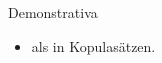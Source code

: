 \begin{syntax}{Demonstrativa}{}
\begin{itemize}
	\item {} als \sbj in Kopulasätzen. \\
\end{itemize}
\end{syntax}
